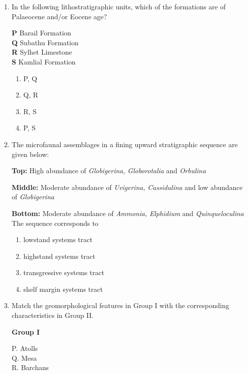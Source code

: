 \documentclass[journal,12pt,onecolumn]{IEEEtran}
\theoremstyle{remark}
\begin{document}
\begin{enumerate}
\item In the following lithostratigraphic units, which of the formations are of Palaeocene and/or Eocene age?

\begin{flushleft}
\textbf{P} Barail Formation \\
\textbf{Q} Subathu Formation \\
\textbf{R} Sylhet Limestone \\
\textbf{S} Kamlial Formation
\end{flushleft}

\begin{multicols}{4}
\begin{enumerate}
\item P, Q  
\item Q, R  
\item R, S  
\item P, S  
\end{enumerate}
\end{multicols}



\item The microfaunal assemblages in a fining upward stratigraphic sequence are given below:

\textbf{Top:} High abundance of \textit{Globigerina, Globorotalia} and \textit{Orbulina}

\textbf{Middle:} Moderate abundance of \textit{Uvigerina, Cassidulina} and low abundance of \textit{Globigerina}

\textbf{Bottom:} Moderate abundance of \textit{Ammonia, Elphidium} and \textit{Quinqueloculina}
The sequence corresponds to
\begin{multicols}{4}
\begin{enumerate}
\item lowstand systems tract  
\item highstand systems tract  
\item transgressive systems tract  
\item shelf margin systems tract  
\end{enumerate}
\end{multicols}






\item Match the geomorphological features in Group I with the corresponding characteristics in Group II.

\begin{multicols}{2}
\textbf{Group I}  
\begin{flushleft}
P. Atolls\\
Q. Mesa\\
R. Barchans
\end{flushleft}


\end{multicols}
\end{enumerate}
\end{document}
